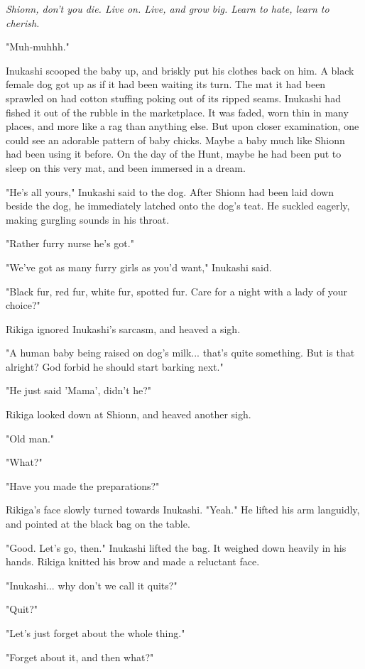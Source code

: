 \emph{Shionn, don't you die. Live on. Live, and grow big. Learn to hate, learn
	to cherish.}

"Muh-muhhh."

Inukashi scooped the baby up, and briskly put his clothes back on him. A
black female dog got up as if it had been waiting its turn. The mat it
had been sprawled on had cotton stuffing poking out of its ripped seams.
Inukashi had fished it out of the rubble in the marketplace. It was
faded, worn thin in many places, and more like a rag than anything else.
But upon closer examination, one could see an adorable pattern of baby
chicks. Maybe a baby much like Shionn had been using it before. On the
day of the Hunt, maybe he had been put to sleep on this very mat, and
been immersed in a dream.

"He's all yours," Inukashi said to the dog. After Shionn had been laid
down beside the dog, he immediately latched onto the dog's teat. He
suckled eagerly, making gurgling sounds in his throat.

"Rather furry nurse he's got."

"We've got as many furry girls as you'd want," Inukashi said.~

"Black fur, red fur, white fur, spotted fur. Care for a night with a
lady of your choice?"

Rikiga ignored Inukashi's sarcasm, and heaved a sigh.

"A human baby being raised on dog's milk... that's quite something. But
is that alright? God forbid he should start barking next."

"He just said 'Mama', didn't he?"

Rikiga looked down at Shionn, and heaved another sigh.

"Old man."

"What?"

"Have you made the preparations?"

Rikiga's face slowly turned towards Inukashi. "Yeah." He lifted his arm
languidly, and pointed at the black bag on the table.

"Good. Let's go, then." Inukashi lifted the bag. It weighed down heavily
in his hands. Rikiga knitted his brow and made a reluctant face.

"Inukashi... why don't we call it quits?"

"Quit?"

"Let's just forget about the whole thing."

"Forget about it, and then what?"

